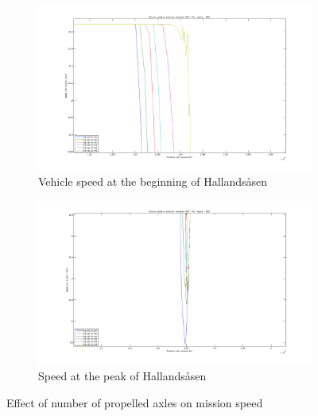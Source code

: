 \documentclass[ExampleMasters.tex]{subfiles}
\begin{document}
\begin{figure}
\begin{subfigure}{.5\textwidth}
\centering
\includegraphics[width=\linewidth]{figures/ModelValidation/PlotsWithNonPredictiveControl/Increasing_number_of_axles/Speed_vs_position_zoomed_no_of_axles_begin_dec.png}
\caption{Vehicle speed at the beginning of Hallands\aa sen}
\end{subfigure}
\begin{subfigure}{.5\textwidth}
\centering
\includegraphics[width=\linewidth]{figures/ModelValidation/PlotsWithNonPredictiveControl/Increasing_number_of_axles/Speed_vs_position_zoomed_no_of_axles_peak.png}
\caption{Speed at the peak of Hallands\aa sen}
\end{subfigure}
\caption{Effect of number of propelled axles on mission speed}
\label{missionSpeedIncreasedPropulsion}
\end{figure}
\end{document}
